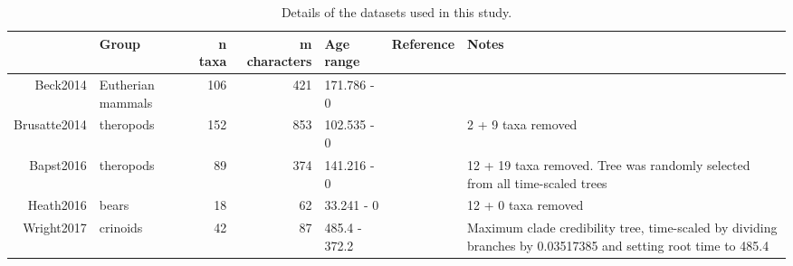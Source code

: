 \begin{table}[ht]
\centering
\begin{tabular}{rlrrlll}
  \hline
 & Group & n taxa & m characters & Age range & Reference & Notes \\ 
  \hline
Beck2014 & Eutherian mammals & 106 & 421 & 171.786 - 0 &  &  \\ 
  Brusatte2014 & theropods & 152 & 853 & 102.535 - 0 &  & 2 + 9 taxa removed \\ 
  Bapst2016 & theropods &  89 & 374 & 141.216 - 0 &  & 12 + 19 taxa removed. Tree was randomly selected from all time-scaled trees \\ 
  Heath2016 & bears &  18 &  62 & 33.241 - 0 &  & 12 + 0 taxa removed \\ 
  Wright2017 & crinoids &  42 &  87 & 485.4 - 372.2 &  & Maximum clade credibility tree, time-scaled by dividing branches by 0.03517385 and setting root time to 485.4 \\ 
   \hline
\end{tabular}
\caption{Details of the datasets used in this study.} 
\end{table}
